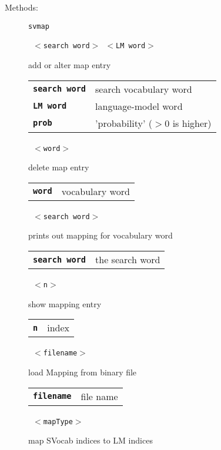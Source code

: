 \begin{description}
\vspace{3mm} \item[Methods:] \texttt{svmap}

    \begin{description}
       \texttt{ $<$search word$>$ $<$LM word$>$ } \

        add or alter map entry

      \begin{tabular}{ll}
 \texttt{\textbf{search word}} &  search vocabulary word  \\
 \texttt{\textbf{LM word}} &      language-model word  \\
 \texttt{\textbf{prob}} &          'probability' ($>$0 is higher)  \\
      \end{tabular}
       \texttt{ $<$word$>$} \

        delete map entry

      \begin{tabular}{ll}
 \texttt{\textbf{word}} &  vocabulary word  \\
      \end{tabular}
       \texttt{ $<$search word$>$} \

        prints out mapping for vocabulary word

      \begin{tabular}{ll}
 \texttt{\textbf{search word}} &  the search word  \\
      \end{tabular}
       \texttt{ $<$n$>$} \

        show mapping entry

      \begin{tabular}{ll}
 \texttt{\textbf{n}} &   index  \\
      \end{tabular}
       \texttt{ $<$filename$>$} \

        load Mapping from binary file

      \begin{tabular}{ll}
 \texttt{\textbf{filename}} &  file name  \\
      \end{tabular}
       \texttt{ $<$mapType$>$ } \

        map SVocab indices to LM indices


\end{description}
\end{description}
